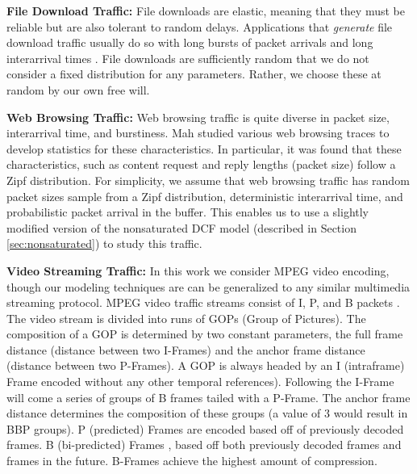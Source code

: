 \documentclass[conference]{IEEEtran}
\begin{document}
\noindent
\textbf{File Download Traffic:} File downloads are elastic, meaning that they must be reliable but are also tolerant to random delays. Applications that \emph{generate} file download traffic usually do so with long bursts of packet arrivals and long interarrival times \cite{kumar2004communication}. File downloads are sufficiently random that we do not consider a fixed distribution for any parameters. Rather, we choose these at random by our own free will. 

\noindent
\textbf{Web Browsing Traffic:} Web browsing traffic is quite diverse in packet size, interarrival time, and burstiness. Mah \cite{mah1997empirical} studied various web browsing traces to develop statistics for these characteristics. In particular, it was found that these characteristics, such as content request and reply lengths (packet size) follow a Zipf distribution. For simplicity, we assume that web browsing traffic has random packet sizes sample from a Zipf distribution, deterministic interarrival time, and probabilistic packet arrival in the buffer. This enables us to use a slightly modified version of the nonsaturated DCF model (described in Section \ref{sec:nonsaturated}) to study this traffic. 

\noindent
\textbf{Video Streaming Traffic:} In this work we consider MPEG video encoding, though our modeling techniques are can be generalized to any similar multimedia streaming protocol. MPEG video traffic streams consist of I, P, and B packets \cite{netperfeval2004,trafficqual2008}. The video stream is divided into runs of GOPs (Group of Pictures). The composition of a GOP is determined by two constant parameters, the full frame distance (distance between two I-Frames) and the anchor frame distance (distance between two P-Frames). A GOP is always headed by an I (intraframe) Frame  encoded without any other temporal references). Following the I-Frame will come a series of groups of B frames tailed with a P-Frame. The anchor frame distance determines the composition of these groups (a value of 3 would result in BBP groups). P (predicted) Frames  are encoded based off of previously decoded frames. B (bi-predicted) Frames , based off both previously decoded frames and frames in the future. B-Frames achieve the highest amount of compression.
\end{document}
